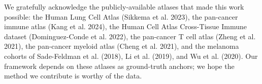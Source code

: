 
We gratefully acknowledge the publicly-available atlases that made
this work possible: the Human Lung Cell Atlas (Sikkema et al. 2023),
the pan-cancer immune atlas (Kang et al. 2024), the Human Cell Atlas
Cross-Tissue Immune dataset (Dominguez-Conde et al. 2022), the
pan-cancer T cell atlas (Zheng et al. 2021), the pan-cancer myeloid
atlas (Cheng et al. 2021), and the melanoma cohorts of Sade-Feldman
et al. (2018), Li et al. (2019), and Wu et al. (2020). Our framework
depends on these atlases as ground-truth anchors; we hope the method
we contribute is worthy of the data.


